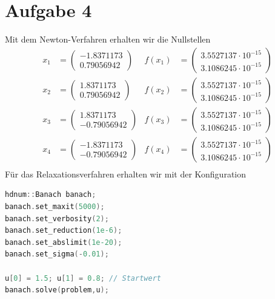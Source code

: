 \documentclass{article}
\theoremstyle{definition}
\begin{document}
\section*{Aufgabe 4}
Mit dem Newton-Verfahren erhalten wir die Nullstellen 
\begin{align*}
    x_1 &= \begin{pmatrix}
        -1.8371173\\
        0.79056942
    \end{pmatrix}& f(x_1) &= \begin{pmatrix}
        3.5527137\cdot 10^{-15}\\
        3.1086245\cdot 10^{-15}
    \end{pmatrix}\\
    x_2 &= \begin{pmatrix}
        1.8371173\\
        0.79056942
    \end{pmatrix}& f(x_2) &= \begin{pmatrix}
        3.5527137\cdot 10^{-15}\\
        3.1086245\cdot 10^{-15}
    \end{pmatrix}\\
    x_3 &= \begin{pmatrix}
        1.8371173\\
        -0.79056942
    \end{pmatrix}& f(x_3) &= \begin{pmatrix}
        3.5527137\cdot 10^{-15}\\
        3.1086245\cdot 10^{-15}
    \end{pmatrix}\\
    x_4 &= \begin{pmatrix}
        -1.8371173\\
        -0.79056942
    \end{pmatrix}& f(x_4) &= \begin{pmatrix}
        3.5527137\cdot 10^{-15}\\
        3.1086245\cdot 10^{-15}
    \end{pmatrix}\\
\end{align*}
Für das Relaxationsverfahren erhalten wir mit der Konfiguration
\begin{lstlisting}[language=c++]
hdnum::Banach banach;
banach.set_maxit(5000);
banach.set_verbosity(2);
banach.set_reduction(1e-6);
banach.set_abslimit(1e-20);
banach.set_sigma(-0.01);

u[0] = 1.5; u[1] = 0.8; // Startwert
banach.solve(problem,u);
\end{lstlisting}
\end{document}
